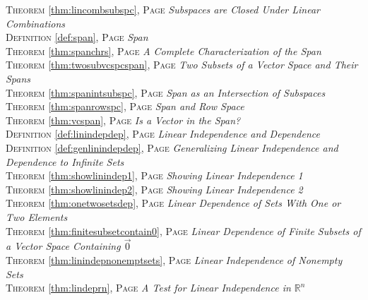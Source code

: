 \begin{multicols}{2}
{\textsc{Theorem} \ref{thm:lincombsubspc}, \textsc{Page} \pageref{thm:lincombsubspc} \textit{Subspaces are Closed Under Linear Combinations} \\
\textsc{Definition} \ref{def:span}, \textsc{Page} \pageref{def:span} \textit{Span} \\
\textsc{Theorem} \ref{thm:spanchrs}, \textsc{Page} \pageref{thm:spanchrs} \textit{A Complete Characterization of the Span} \\
\textsc{Theorem} \ref{thm:twosubvcspcspan}, \textsc{Page} \pageref{thm:twosubvcspcspan} \textit{Two Subsets of a Vector Space and Their Spans} \\
\textsc{Theorem} \ref{thm:spanintsubspc}, \textsc{Page} \pageref{thm:spanintsubspc} \textit{Span as an Intersection of Subspaces} \\
\textsc{Theorem} \ref{thm:spanrowspc}, \textsc{Page} \pageref{thm:spanrowspc} \textit{Span and Row Space} \\
\textsc{Theorem} \ref{thm:vcspan}, \textsc{Page} \pageref{thm:vcspan} \textit{Is a Vector in the Span?} \\
\textsc{Definition} \ref{def:linindepdep}, \textsc{Page} \pageref{def:linindepdep} \textit{Linear Independence and Dependence} \\
\textsc{Definition} \ref{def:genlinindepdep}, \textsc{Page} \pageref{def:genlinindepdep} \textit{Generalizing Linear Independence and Dependence to Infinite Sets} \\
\textsc{Theorem} \ref{thm:showlinindep1}, \textsc{Page} \pageref{thm:showlinindep1} \textit{Showing Linear Independence 1} \\
\textsc{Theorem} \ref{thm:showlinindep2}, \textsc{Page} \pageref{thm:showlinindep2} \textit{Showing Linear Independence 2} \\
\textsc{Theorem} \ref{thm:onetwosetsdep}, \textsc{Page} \pageref{thm:onetwosetsdep} \textit{Linear Dependence of Sets With One or Two Elements} \\
\textsc{Theorem} \ref{thm:finitesubsetcontain0}, \textsc{Page} \pageref{thm:finitesubsetcontain0} \textit{Linear Dependence of Finite Subsets of a Vector Space Containing \(\vec {0}\)} \\
\textsc{Theorem} \ref{thm:linindepnonemptsets}, \textsc{Page} \pageref{thm:linindepnonemptsets} \textit{Linear Independence of Nonempty Sets} \\
\textsc{Theorem} \ref{thm:lindeprn}, \textsc{Page} \pageref{thm:lindeprn} \textit{A Test for Linear Independence in \(\mathbb {R}^n\)} \\
}
\end{multicols}

